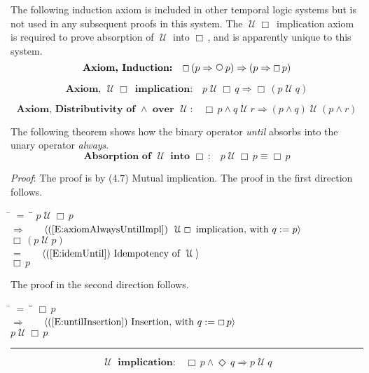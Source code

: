 \documentclass[12pt, fleqn, leqno]{article}
\newcommand{\lgap}{2pt}                             %
\newcommand{\mymathindent}{24pt}                    %
\newcommand{\impl}{\ensuremath{\Rightarrow}}        %
\newcommand{\Until}{\;\mathcal{U}\;}
\newcommand{\Next}{\;\,\text{\raisebox{3.5pt}{\circle{6}}}}
\newcommand{\Event}{\Diamond\,}
\newcommand{\Always}{\Box\,}
\newcommand{\myqed}{\rule[-.23ex]{1.2ex}{2.0ex}}
\newcommand{\myqedtab}{\hspace{384pt}}              %
\newcommand{\firstspacer}{\vspace{-26pt}}
\newcommand{\Gll} {\langle}                         %
\newcommand{\Ggg} {\rangle}                         %
\newcommand{\Hint}[1]     {\ \ \ $\Gll              \mbox{#1} \Ggg$ }   %
\begin{document}
The following induction axiom is included in other temporal logic systems but is not used in any subsequent proofs in this system.
The $\Until\Always$ implication axiom is required to prove absorption of $\Until$ into $\Always$,
and is apparently unique to this system.
\begin{equation}\label{E:induction}
\textbf{Axiom, Induction:}\quad \Always (p \impl \Next p) \impl (p \impl \Always p)
\end{equation}

\firstspacer

\begin{equation}\label{E:axiomAlwaysUntilImpl}
\textbf{Axiom, $\Until\Always$ implication:}\quad p\Until \Always q\impl \Always (p\Until q)
\end{equation}

\firstspacer

\begin{equation}\label{E:andUntilDist}
\textbf{Axiom, Distributivity of $\land$ over $\Until$:}\quad \Always p \land q \Until r \impl (p \land q) \Until (p \land r)
\end{equation}

The following theorem shows how the binary operator \textit{until} absorbs into the unary operator \textit{always}.
\begin{equation}\label{E:absUntilAlways}
\textbf{Absorption of $\Until$ into $\Always$:}\quad p \Until \Always p \equiv \Always p
\end{equation}

\emph{Proof}: The proof is by (4.7) Mutual implication.
The proof in the first direction follows.
\begin{tabbing}
\hspace{\mymathindent} \= $= \;$ \= \myqedtab \= \kill
\> \> $p \Until \Always p$\\[\lgap]
\> $\impl$ \> \Hint{(\ref{E:axiomAlwaysUntilImpl}) $\Until\Always$ implication, with $q:=p$} \\[\lgap]
\> \> $\Always (p \Until p)$\\[\lgap]
\> $=$ \> \Hint{(\ref{E:idemUntil}) Idempotency of $\Until$} \\[\lgap]
\> \> $\Always p$
\end{tabbing}
The proof in the second direction follows.
\begin{tabbing}
\hspace{\mymathindent} \= $= \;$ \= \myqedtab \= \kill
\> \> $\Always p$\\[\lgap]
\> $\impl$ \> \Hint{(\ref{E:untilInsertion}) Insertion, with $q:=\Always p$} \\[\lgap]
\> \> $p \Until \Always p$ \quad \myqed
\end{tabbing}
\begin{equation}\label{E:axiomUntilImpl}
\textbf{$\Until$ implication:}\quad \Always p \land \Event q \impl p \Until q
\end{equation}
\end{document}
